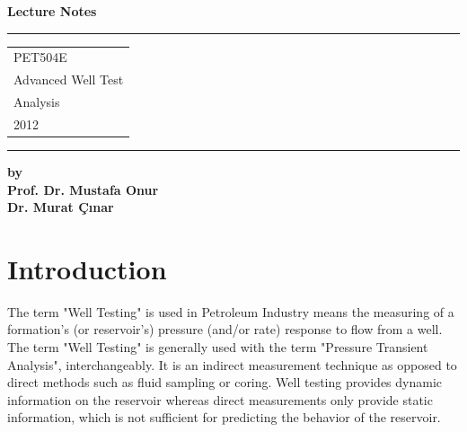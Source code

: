 \documentclass{llncs}
\numberwithin{equation}{section}
\numberwithin{figure}{section}
\numberwithin{table}{section}
\begin{document}
    \thispagestyle{empty}
    \begin{flushleft}
        \LARGE\bfseries Lecture Notes\\[1cm]
    \end{flushleft}
    \rule{\textwidth}{1pt}
    \vspace{2pt}
    \begin{flushright}
        \Huge
            \begin{tabular}{@{}l}
                PET504E \\
                Advanced Well Test \\
                Analysis\\[6pt]
                {\Large 2012}
            \end{tabular}
        \end{flushright}
    \rule{\textwidth}{1pt}

    \begin{flushleft}
        \LARGE\bfseries by\\ Prof. Dr. Mustafa Onur \\[0.5cm]
        Dr. Murat \c{C}{\i}nar\\

    \end{flushleft}
    \vfill

    \section{Introduction}
%
    The term "Well Testing"  is used in Petroleum Industry means the measuring of a formation's
    (or reservoir's) pressure (and/or rate) response to flow from a well. The term "Well Testing"
    is generally used with the term "Pressure Transient Analysis", interchangeably. It is an indirect
    measurement technique as opposed to direct methods such as fluid sampling or coring. Well testing
    provides dynamic information on the reservoir whereas direct measurements only provide static
    information, which is not sufficient for predicting the behavior of the reservoir.\\
\end{document}
